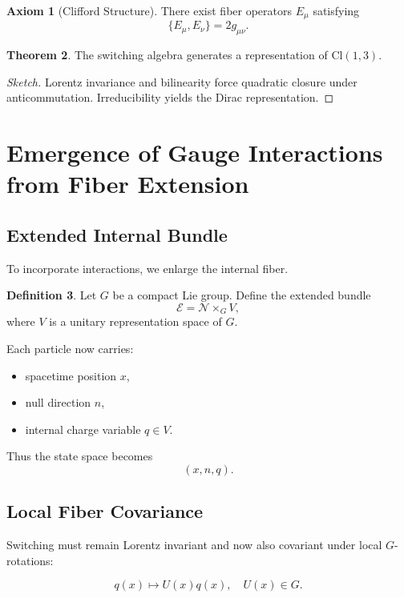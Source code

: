 \documentclass[11pt]{article}
\theoremstyle{definition}
\newtheorem{definition}{Definition}[section]
\newtheorem{axiom}[definition]{Axiom}
\newtheorem{theorem}[definition]{Theorem}
\begin{document}
\begin{axiom}[Clifford Structure]
There exist fiber operators $E_\mu$ satisfying
\[
\{E_\mu,E_\nu\}=2g_{\mu\nu}.
\]
\end{axiom}

\begin{theorem}
The switching algebra generates a representation of
$\mathrm{Cl}(1,3)$.
\end{theorem}

\begin{proof}[Sketch]
Lorentz invariance and bilinearity force quadratic closure
under anticommutation. Irreducibility yields the Dirac representation.
\end{proof}
\section{Emergence of Gauge Interactions from Fiber Extension}

\subsection{Extended Internal Bundle}

To incorporate interactions, we enlarge the internal fiber.

\begin{definition}
Let $G$ be a compact Lie group.
Define the extended bundle
\[
\mathcal{E}
=
\mathcal{N} \times_G V,
\]
where $V$ is a unitary representation space of $G$.
\end{definition}

Each particle now carries:

\begin{itemize}
\item spacetime position $x$,
\item null direction $n$,
\item internal charge variable $q \in V$.
\end{itemize}

Thus the state space becomes
\[
(x,n,q).
\]

\subsection{Local Fiber Covariance}

Switching must remain Lorentz invariant
and now also covariant under local $G$-rotations:

\[
q(x) \mapsto U(x) q(x),
\quad U(x) \in G.
\]
\end{document}
